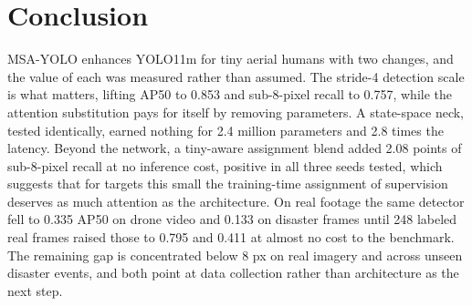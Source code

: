 \documentclass[conference,a4paper]{IEEEtran}
\begin{document}
\section{Conclusion}
MSA-YOLO enhances YOLO11m for tiny aerial humans with two changes, and the value
of each was measured rather than assumed. The stride-4 detection scale is what
matters, lifting AP50 to 0.853 and sub-8-pixel recall to 0.757, while the
attention substitution pays for itself by removing parameters. A state-space
neck, tested identically, earned nothing for 2.4 million parameters and 2.8 times
the latency. Beyond the network, a tiny-aware assignment blend added 2.08 points
of sub-8-pixel recall at no inference cost, positive in all three seeds tested,
which suggests that for targets this small the training-time assignment of
supervision deserves as much attention as the architecture. On real footage the
same detector fell to 0.335 AP50 on drone video and 0.133 on disaster frames
until 248 labeled real frames raised those to 0.795 and 0.411 at almost no cost
to the benchmark. The remaining gap is concentrated below 8 px on real imagery
and across unseen disaster events, and both point at data collection rather than
architecture as the next step.



\end{document}

